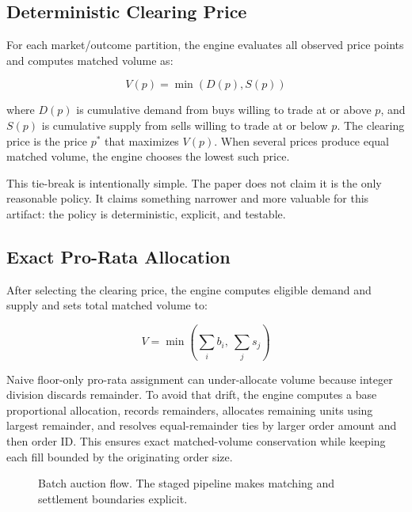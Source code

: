 \documentclass[11pt]{article}
\begin{document}
\subsection{Deterministic Clearing Price}

For each market/outcome partition, the engine evaluates all observed price points and computes matched volume as:

\[
V(p) = \min(D(p), S(p))
\]

where \(D(p)\) is cumulative demand from buys willing to trade at or above \(p\), and \(S(p)\) is cumulative supply from sells willing to trade at or below \(p\). The clearing price is the price \(p^\ast\) that maximizes \(V(p)\). When several prices produce equal matched volume, the engine chooses the lowest such price.

This tie-break is intentionally simple. The paper does not claim it is the only reasonable policy. It claims something narrower and more valuable for this artifact: the policy is deterministic, explicit, and testable.

\subsection{Exact Pro-Rata Allocation}

After selecting the clearing price, the engine computes eligible demand and supply and sets total matched volume to:

\[
V = \min \left(\sum_i b_i,\ \sum_j s_j \right)
\]

Naive floor-only pro-rata assignment can under-allocate volume because integer division discards remainder. To avoid that drift, the engine computes a base proportional allocation, records remainders, allocates remaining units using largest remainder, and resolves equal-remainder ties by larger order amount and then order ID. This ensures exact matched-volume conservation while keeping each fill bounded by the originating order size.

\begin{figure}[ht]
  \centering
  \caption{Batch auction flow. The staged pipeline makes matching and settlement boundaries explicit.}
  \label{fig:flow}
\end{figure}
\end{document}
